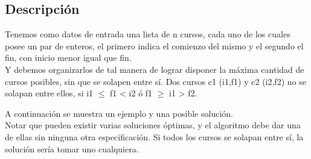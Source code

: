 \subsection{Descripci\'on}
Tenemos como datos de entrada una lista de n cursos, cada uno de los cuales posee un par de enteros, el primero indica el comienzo del mismo y el segundo el fin, con inicio menor igual que fin. \\
Y debemos organizarlos de tal manera de lograr disponer la máxima cantidad de cursos posibles, sin que se solapen entre sí. Dos cursos c1 (i1,f1) y c2 (i2,f2) no se solapan entre ellos, si i1 $\leq$ f1 <  i2  ó f1 $\geq$ i1 > f2.

A continuación se muestra un ejemplo y una posible solución.\\


Notar que pueden existir varias soluciones óptimas, y el algoritmo debe dar una de ellas sin ninguna otra especificación. Si todos los cursos se solapan entre sí, la solución sería tomar uno cualquiera.\\
